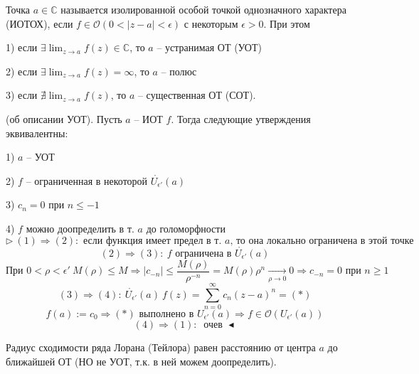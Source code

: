  Точка $a \in \mathbb{C}$ называется изолированной особой точкой однозначного характера (ИОТОХ), если $f \in \mathcal{O}(0 < |z-a| < \epsilon)$ с некоторым $\epsilon > 0$. При этом 

1) если $\exists \lim_{z\to a} f(z) \in \mathbb{C}$, то $a$ -- устранимая ОТ (УОТ)

2) если $\exists \lim_{z\to a} f(z) = \infty$, то $a$ -- полюс

3) если $\nexists \lim_{z\to a} f(z)$, то $a$ -- существенная ОТ (СОТ).

 (об описании УОТ). Пусть $a$ -- ИОТ $f$. Тогда следующие утверждения эквивалентны:

1) $a$ -- УОТ

2) $f$ -- ограниченная в некоторой $\mathring{U_{\epsilon'}}(a)$

3) $c_n = 0$ при $n \leq -1$

4) $f$ можно доопределить в т. $a$ до голоморфности
\[\triangleright \ (1) \Rightarrow (2): \text{ если функция имеет предел в т. $a$, то она локально ограничена в этой точке}\]
\[(2) \Rightarrow (3): \ f \text{ ограничена в } \mathring{U_{\epsilon'}}(a)\]
\[\text{При } 0 < \rho < \epsilon' \ M(\rho) \leq M \Rightarrow |c_{-n}| \leq \frac{M(\rho)}{\rho^{-n}} = M(\rho)\rho^n \underset{\rho\to 0}{\to} 0 \Rightarrow c_{-n} = 0 \text{ при } n \geq 1\]
\[(3) \Rightarrow (4): \ \mathring{U_{\epsilon'}}(a) \ f(z) = \sum_{n=0}^\infty c_n (z-a)^n = (*)\]
\[f(a) := c_0 \Rightarrow (*) \text{ выполнено в } U_{\epsilon'}(a) \Rightarrow f \in \mathcal{O}(U_{\epsilon'}(a))\]
\[(4) \Rightarrow (1): \ \text{ очев } \blacktriangleleft\]

 Радиус сходимости ряда Лорана (Тейлора) равен расстоянию от центра $a$ до ближайшей ОТ (НО не УОТ, т.к. в ней можем доопределить).